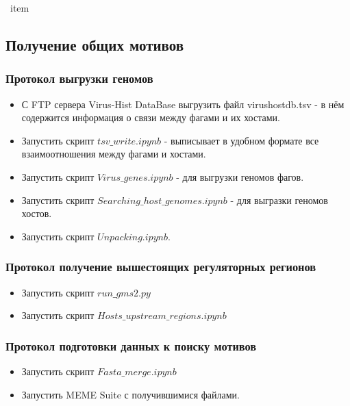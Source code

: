 \documentclass[14pt]{extarticle}
\begin{document}
\begin{center}
\     item \subsection{Получение общих мотивов}
      \item  \subsubsection{Протокол выгрузки геномов}
\end{center}
    \begin{itemize}
        \item С FTP сервера Virus-Hist DataBase выгрузить файл virushostdb.tsv - в нём содержится информация о связи между фагами и их хостами.
    
        \item Запустить скрипт \(tsv\_write.ipynb\) - выписывает в удобном формате все взаимоотношения между фагами и хостами.
    
      \item Запустить скрипт \(Virus\_genes.ipynb\) - для выгрузки геномов фагов.
        \item Запустить скрипт \(Searching\_host\_genomes.ipynb\) - для выгразки геномов хостов.
        \item Запустить скрипт \(Unpacking.ipynb\).

    \end{itemize}

    \begin{center}
    \item \subsubsection{Протокол получение вышестоящих регуляторных регионов}
    \end{center}
        \begin{itemize}
            \item Запустить скрипт \(run\_gms2.py\)
            \item Запустить скрипт \(Hosts\_upstream\_regions.ipynb\)
        \end{itemize}
    \begin{center}
    \item \subsubsection{Протокол подготовки данных к поиску мотивов}
    \end{center}
        \begin{itemize}
            \item Запустить скрипт \(Fasta\_merge.ipynb\)
            \item Запустить MEME Suite с получившимися файлами.
        \end{itemize}
\end{document}
